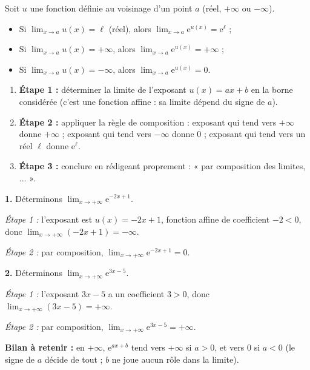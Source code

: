 \documentclass[11pt]{article}
\newcommand{\cle}[1]{{\popxbold\color{popdark}#1}}
\begin{document}
\begin{propriete}
Soit $u$ une fonction définie au voisinage d'un point $a$ (réel, $+\infty$ ou $-\infty$).
\begin{itemize}
\item Si $\displaystyle\lim_{x \to a} u(x) = \ell$ (réel), alors $\displaystyle\lim_{x \to a} \mathrm{e}^{u(x)} = \mathrm{e}^{\ell}$ ;
\item Si $\displaystyle\lim_{x \to a} u(x) = +\infty$, alors $\displaystyle\lim_{x \to a} \mathrm{e}^{u(x)} = +\infty$ ;
\item Si $\displaystyle\lim_{x \to a} u(x) = -\infty$, alors $\displaystyle\lim_{x \to a} \mathrm{e}^{u(x)} = 0$.
\end{itemize}
\end{propriete}

\begin{methode}
\begin{enumerate}
\item \textbf{Étape 1 :} déterminer la limite de l'\cle{exposant} $u(x) = ax + b$ en la borne considérée (c'est une fonction affine : sa limite dépend du signe de $a$).
\item \textbf{Étape 2 :} appliquer la règle de composition : exposant qui tend vers $+\infty$ donne $+\infty$ ; exposant qui tend vers $-\infty$ donne $0$ ; exposant qui tend vers un réel $\ell$ donne $\mathrm{e}^{\ell}$.
\item \textbf{Étape 3 :} conclure en rédigeant proprement : « par composition des limites, ... ».
\end{enumerate}
\end{methode}

\begin{exemplebox}
\textbf{1.} Déterminons $\displaystyle\lim_{x \to +\infty} \mathrm{e}^{-2x+1}$.

\emph{Étape 1 :} l'exposant est $u(x) = -2x + 1$, fonction affine de coefficient $-2 < 0$, donc $\displaystyle\lim_{x \to +\infty} (-2x+1) = -\infty$.

\emph{Étape 2 :} par composition, $\displaystyle\lim_{x \to +\infty} \mathrm{e}^{-2x+1} = 0$.

\textbf{2.} Déterminons $\displaystyle\lim_{x \to +\infty} \mathrm{e}^{3x-5}$.

\emph{Étape 1 :} l'exposant $3x - 5$ a un coefficient $3 > 0$, donc $\displaystyle\lim_{x \to +\infty} (3x-5) = +\infty$.

\emph{Étape 2 :} par composition, $\displaystyle\lim_{x \to +\infty} \mathrm{e}^{3x-5} = +\infty$.

\textbf{Bilan à retenir :} en $+\infty$, $\mathrm{e}^{ax+b}$ tend vers $+\infty$ si $a > 0$, et vers $0$ si $a < 0$ (le signe de $a$ décide de tout ; $b$ ne joue aucun rôle dans la limite).
\end{exemplebox}
\end{document}

